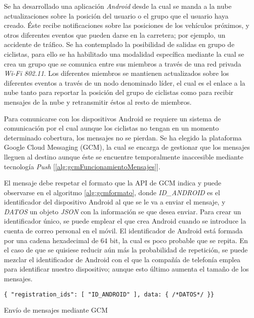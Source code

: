 Se ha desarrollado una aplicación \emph{Android} desde la cual se manda a la nube actualizaciones sobre la posición del usuario o el grupo que el usuario haya creado. \'Este recibe notificaciones sobre las posiciones de los vehículos próximos, y otros diferentes eventos que pueden darse en la carretera; por ejemplo, un accidente de tráfico. Se ha contemplado la posibilidad de salidas en grupo de ciclistas, para ello se ha habilitado una modalidad específica mediante la cual se crea un grupo que se comunica entre sus miembros a través de una red privada \emph{Wi-Fi 802.11}. Los diferentes miembros se mantienen actualizados sobre los diferentes eventos a través de un nodo denominado líder, el cual es el enlace a la nube tanto para reportar la posición del grupo de ciclistas como para recibir mensajes de la nube y retransmitir éstos al resto de miembros.

Para comunicarse con los dispositivos Android se requiere un sistema de comunicación por el cual aunque los ciclistas no tengan en un momento determinado cobertura, los mensajes no se pierdan. Se ha elegido la plataforma Google Cloud Messaging (GCM), la cual se encarga de gestionar que los mensajes lleguen al destino aunque éste se encuentre temporalmente inaccesible mediante tecnología \emph{Push} [\ref{alg:gcmFuncionamientoMensajes}]. 

El mensaje debe respetar el formato que la API de GCM indica y puede observarse en el algoritmo \ref{alg:gcmformato}, donde \emph{ID\_ANDROID} es el identificador del dispositivo Android al que se le va a enviar el mensaje, y \emph{DATOS} un objeto \emph{JSON} con la información se que desea enviar. Para crear un identificador único, se puede emplear el que crea Android cuando se introduce la cuenta de correo personal en el móvil. El identificador de Android está formada por una cadena hexadecimal de 64 bit, la cual es poco probable que se repita. En el caso de que se quisiese reducir aún más la probabilidad de repetición, se puede mezclar el identificador de Android con el que la compañía de telefonía emplea para identificar nuestro dispositivo; aunque esto último aumenta el tamaño de los mensajes.

\begin{listing}
	\begin{minipage}{.4\textwidth}
		\begin{verbatim}
{ "registration_ids": [ "ID_ANDROID" ], data: { /*DATOS*/ }}
		\end{verbatim}
	\end{minipage}
	\caption{Envío de mensajes mediante GCM}\label{alg:gcmformato}
\end{listing}

